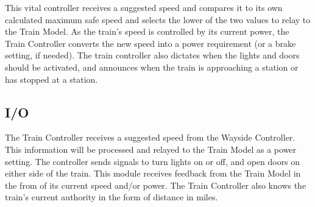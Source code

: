 \documentclass{scrreprt}
\begin{document}
This vital controller receives a suggested speed and compares it to its own calculated maximum safe speed and selects the lower of the two values to relay to the Train Model. As the train's speed is controlled by its current power, the Train Controller converts the new speed into a power requirement (or a brake setting, if needed).  The train controller also dictates when the lights and doors should be activated, and announces when the train is approaching a station or has stopped at a station.

\subsection{I/O}
The Train Controller receives a suggested speed from the Wayside Controller. This information will be processed and relayed to the Train Model as a power setting.  The controller sends signals to turn lights on or off, and open doors on either side of the train.  This module receives feedback from the Train Model in the from of its current speed and/or power.  The Train Controller also knows the train's current authority in the form of distance in miles.
\end{document}
